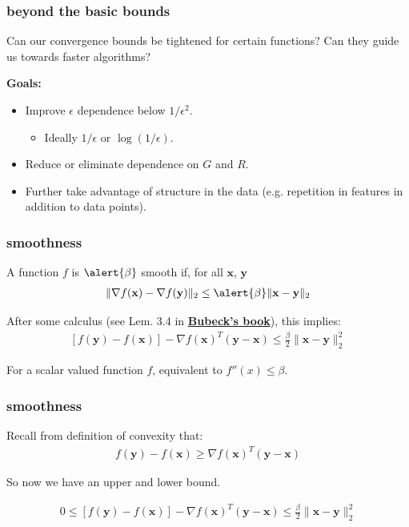 \documentclass[compress]{beamer}
\newcommand{\bv}[1]{\mathbf{#1}}
\begin{document}
\begin{frame}
	\frametitle{beyond the basic bounds}
	Can our convergence bounds be tightened for certain functions? Can they guide us towards faster algorithms?
	
	\textbf{Goals:}
	\begin{itemize}
		\item Improve $\epsilon$ dependence below $1/\epsilon^2$.
		\begin{itemize}
			\item Ideally $1/\epsilon$ or $\log(1/\epsilon)$. 
		\end{itemize}
		\item Reduce or eliminate dependence on $G$ and $R$.
		\item Further take advantage of structure in the data (e.g. repetition in features in addition to data points).  
	\end{itemize}
\end{frame}

\begin{frame}[t]
	\frametitle{smoothness}
	\begin{definition}
		A function $f$ is $\alert{\beta}$ smooth if, for all $\bv{x}$, $\bv{y}$
		\begin{align*}
			\|\nabla f(\bv{x}) - \nabla f(\bv{y})\|_2 \leq \alert{\beta} \|\bv{x} - \bv{y}\|_2
		\end{align*}
	\end{definition}
\vspace{-.5em}
	After some calculus (see Lem. 3.4 in \color{blue}\textbf{\href{https://arxiv.org/pdf/1405.4980.pdf}{Bubeck's book}}\color{black}), this implies:
	\vspace{-1.5em}
	\begin{align*}
		\left[f(\bv{y}) - f(\bv{x})\right] - \nabla f(\bv{x})^T(\bv{y} - \bv{x})  \leq \frac{\beta}{2}\|\bv{x} - \bv{y}\|_2^2
	\end{align*}


\vspace{6em}
For a scalar valued function $f$, equivalent to $f''(x) \leq \beta$. 
\end{frame}

\begin{frame}[t]
	\frametitle{smoothness}
	Recall from definition of convexity that:
	\begin{align*}
		f(\bv{y}) - f(\bv{x}) \geq \nabla f(\bv{x})^T(\bv{y} - \bv{x})
	\end{align*}
	\begin{center}
		\alert{So now we have an upper and lower bound.}
	\end{center}
	\begin{align*}
		0 \leq \left[f(\bv{y}) - f(\bv{x})\right] - \nabla f(\bv{x})^T(\bv{y} - \bv{x}) \leq \frac{\beta}{2}\|\bv{x} - \bv{y}\|_2^2
	\end{align*}
\end{frame}
\end{document}
